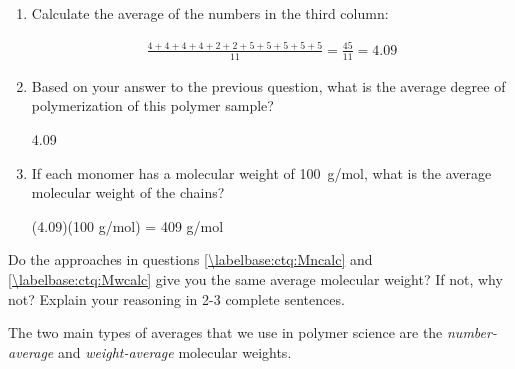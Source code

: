 \begin{activity}
\begin{ctqs}
\begin{enumerate}
			\item Calculate the average of the numbers in the third column:
			
				\begin{solution}[1.5in]
				
					\begin{align*}
						\frac{4+4+4+4+2+2+5+5+5+5+5}{11} = \frac{45}{11} = 4.09
					\end{align*}
				
				\end{solution}
			
			\item Based on your answer to the previous question, what is the average degree of polymerization of this polymer sample?
			
				\begin{solution}[0.75in]
					4.09
				\end{solution}
				
			\item If each monomer has a molecular weight of 100~g/mol, what is the average molecular weight of the chains?
			
				\begin{solution}[0.75in]
					(4.09)(100 g/mol) = 409 g/mol
				\end{solution}
				
		\end{enumerate}
		
	\question Do the approaches in questions \ref{\labelbase:ctq:Mncalc} and \ref{\labelbase:ctq:Mwcalc} give you the same average molecular weight?  If not, why not?  Explain your reasoning in 2-3 complete sentences.
	
		\begin{solution}[3in]\end{solution}
		
\end{ctqs}

\begin{infobox}
\label{\labelbase:infobox:MnMw}
	
	The two main types of averages that we use in polymer science are the \emph{number-average} and \emph{weight-average} molecular weights.
	

\end{infobox}
\end{activity}
